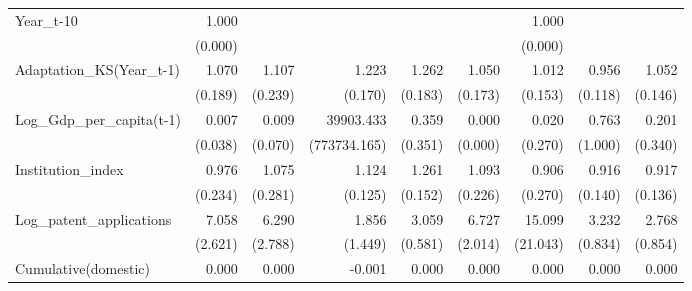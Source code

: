 \begin{table}[htbp]
\begin{tabular}{l*{8}{D{.}{.}{-1}}}
Year\_t-10           &       1.000         &                     &                     &                     &                     &       1.000         &                     &                     \\
                    &     (0.000)         &                     &                     &                     &                     &     (0.000)         &                     &                     \\
Adaptation\_KS(Year\_t-1)&       1.070         &       1.107         &       1.223\sym{\%}  &       1.262\sym{\%}  &       1.050         &       1.012         &       0.956         &       1.052         \\
                    &     (0.189)         &     (0.239)         &     (0.170)         &     (0.183)         &     (0.173)         &     (0.153)         &     (0.118)         &     (0.146)         \\
Log\_Gdp\_per\_capita(t-1)&       0.007         &       0.009         &   39903.433         &       0.359         &       0.000\sym{**} &       0.020         &       0.763         &       0.201         \\
                    &     (0.038)         &     (0.070)         &(773734.165)         &     (0.351)         &     (0.000)         &     (0.270)         &     (1.000)         &     (0.340)         \\
Institution\_index   &       0.976         &       1.075         &       1.124         &       1.261\sym{*}  &       1.093         &       0.906         &       0.916         &       0.917         \\
                    &     (0.234)         &     (0.281)         &     (0.125)         &     (0.152)         &     (0.226)         &     (0.270)         &     (0.140)         &     (0.136)         \\
Log\_patent\_applications&       7.058\sym{***}&       6.290\sym{***}&       1.856         &       3.059\sym{***}&       6.727\sym{***}&      15.099\sym{*}  &       3.232\sym{***}&       2.768\sym{***}\\
                    &     (2.621)         &     (2.788)         &     (1.449)         &     (0.581)         &     (2.014)         &    (21.043)         &     (0.834)         &     (0.854)         \\
\midrule
Cumulative(domestic)&       0.000         &       0.000         &      -0.001         &       0.000         &       0.000         &       0.000         &       0.000         &       0.000         \\

\end{tabular}
\end{table}
